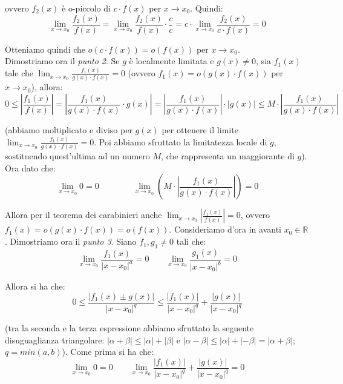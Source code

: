 \documentclass{article}
\begin{document}
\noindent ovvero $f_2(x)$ è o-piccolo di $c \cdot f(x)$ per $x \to x_0$. Quindi:
\begin{equation*}
    \lim_{x \to x_0} \frac{f_2(x)}{f(x)} = \lim_{x \to x_0} \frac{f_2(x)}{f(x)} \cdot \frac{c}{c} = c \cdot \lim_{x \to x_0} \frac{f_2(x)}{c \cdot f(x)} = 0
\end{equation*}

\noindent Otteniamo quindi che $o(c \cdot f(x)) = o(f(x))$ per $x \to x_0$.\\
Dimostriamo ora il \textit{punto 2}. Se $g$ è localmente limitata e $g(x) \neq 0$, sia $f_1(x)$ tale che $\lim_{x \to x_0} \frac{f_1(x)}{g(x) \cdot f(x)} = 0$ (ovvero $f_1(x) = o(g(x) \cdot f(x))$ per $x \to x_0$), allora:
\begin{equation*}
    0 \leq \left|\frac{f_1(x)}{f(x)}\right| = \left|\frac{f_1(x)}{g(x) \cdot f(x)} \cdot g(x)\right| = \left|\frac{f_1(x)}{g(x) \cdot f(x)}\right| \cdot |g(x)| \leq M \cdot \left|\frac{f_1(x)}{g(x) \cdot f(x)}\right|
\end{equation*}

\noindent (abbiamo moltiplicato e diviso per $g(x)$ per ottenere il limite $\lim_{x \to x_0} \frac{f_1(x)}{g(x) \cdot f(x)} = 0$. Poi abbiamo sfruttato la limitatezza locale di $g$, sostituendo quest'ultima ad un numero $M$, che rappresenta un maggiorante di $g$). Ora dato che:
\begin{equation*}
    \lim_{x \to x_0} 0 = 0 \qquad \qquad \lim_{x \to x_0} \left(M \cdot \left|\frac{f_1(x)}{g(x) \cdot f(x)}\right|\right) = 0
\end{equation*}

\noindent Allora per il teorema dei carabinieri anche $\lim_{x \to x_0} \left|\frac{f_1(x)}{f(x)}\right| = 0$, ovvero $f_1(x) = o(g(x) \cdot f(x)) = o(f(x))$.
Consideriamo d'ora in avanti $x_0 \in \mathbb{R}$. Dimostriamo ora il \textit{punto 3}. Siano $f_1, g_1 \neq 0$ tali che:
\begin{equation*}
    \lim_{x \to x_0} \frac{f_1(x)}{|x - x_0|^a} = 0 \qquad \lim_{x \to x_0} \frac{g_1(x)}{|x - x_0|^b} = 0
\end{equation*}

\noindent Allora si ha che:
\begin{equation*}
    0 \leq \frac{|f_1(x) \pm g(x)|}{|x - x_0|^q} \leq \frac{|f_1(x)|}{|x - x_0|^q} + \frac{|g(x)|}{|x - x_0|^q}
\end{equation*}

\noindent (tra la seconda e la terza espressione abbiamo sfruttato la seguente disuguaglianza triangolare: $|\alpha + \beta| \leq |\alpha| +|\beta|$ e $|\alpha - \beta| \leq |\alpha| + |-\beta| = |\alpha + \beta|$; $q = min(a, b)$). Come prima si ha che:
\begin{equation*}
    \lim_{x \to x_0} 0 = 0 \qquad \lim_{x \to x_0} \frac{|f_1(x)|}{|x - x_0|^q} + \frac{|g(x)|}{|x - x_0|^q} = 0
\end{equation*}
\end{document}
